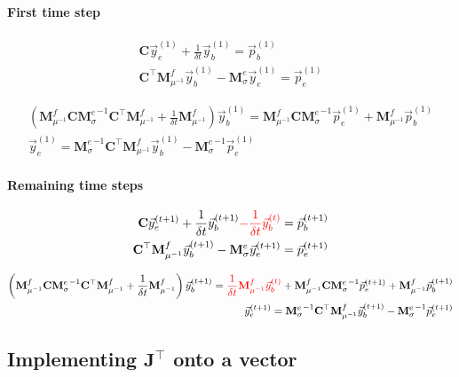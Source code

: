 \documentclass[]{article}
\newcommand{\dcurl}{{\mathbf C}}
\newcommand{\M}{{\mathbf M}}
\newcommand{\MfMui}{{\M^f_{\mu^{-1}}}}
\newcommand{\MeSig}{{\M^e_\sigma}}
\begin{document}
\paragraph{First time step}

\begin{subequations}
    \begin{align}
        \dcurl \vec{y}_{e}^{(1)} + \frac{1}{\delta t} \vec{y}_{b}^{(1)} = \vec{p}_b^{(1)} \\
        \dcurl^\top \MfMui \vec{y}_b^{(1)} - \MeSig \vec{y}_e^{(1)} = \vec{p}_e^{(1)}
    \end{align}
\end{subequations}

\begin{subequations}
    \begin{align}
        \left( \MfMui \dcurl \MeSig^{-1} \dcurl^\top \MfMui + \frac{1}{\delta t} \MfMui \right) \vec{y}_{b}^{(1)} = \MfMui \dcurl \MeSig^{-1} \vec{p}_e^{(1)} + \MfMui \vec{p}_b^{(1)} \\
        \vec{y}_e^{(1)} = \MeSig^{-1} \dcurl^\top \MfMui \vec{y}_b^{(1)} - \MeSig^{-1} \vec{p}_e^{(1)}
    \end{align}
\end{subequations}

\paragraph{Remaining time steps}

\begin{subequations}
    \begin{align}
        \dcurl \vec{y}_{e}^{(t+1)} + \frac{1}{\delta t} \vec{y}_{b}^{(t+1)}
        {\color{red}- \frac{1}{\delta t} \vec{y}_{b}^{(t)} }
        = \vec{p}_b^{(t+1)} \\
        \dcurl^\top \MfMui \vec{y}_b^{(t+1)} - \MeSig \vec{y}_e^{(t+1)} = \vec{p}_e^{(t+1)}
    \end{align}
\end{subequations}

\begin{subequations}
        \begin{align}
            \left( \MfMui \dcurl \MeSig^{-1} \dcurl^\top \MfMui + \frac{1}{\delta t} \MfMui \right) \vec{y}_{b}^{(t+1)} =
            {\color{red} \frac{1}{\delta t} \MfMui \vec{y}_b^{(t)} }
            + \MfMui \dcurl \MeSig^{-1} \vec{p}_e^{(t+1)} + \MfMui \vec{p}_b^{(t+1)} \\
            \vec{y}_e^{(t+1)} = \MeSig^{-1} \dcurl^\top \MfMui \vec{y}_b^{(t+1)} - \MeSig^{-1} \vec{p}_e^{(t+1)}
        \end{align}
    \end{subequations}

\subsection{Implementing $\mathbf{J}^\top$ onto a vector}
\end{document}
